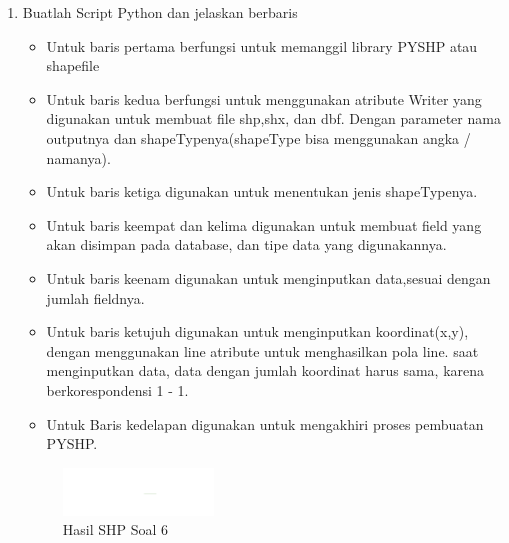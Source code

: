 \begin{enumerate}
	\item Buatlah Script Python dan jelaskan berbaris
	
	\begin{itemize}
		\item Untuk baris pertama berfungsi untuk memanggil library PYSHP atau shapefile
		\item Untuk baris kedua berfungsi untuk menggunakan atribute Writer yang digunakan untuk membuat file shp,shx, dan dbf. \hfill\break Dengan parameter nama outputnya dan shapeTypenya(shapeType bisa menggunakan angka / namanya).
		\item Untuk baris ketiga digunakan untuk menentukan jenis shapeTypenya.
		\item Untuk baris keempat dan kelima digunakan untuk membuat field yang akan disimpan pada database, dan tipe data yang digunakannya.
		\item Untuk baris keenam digunakan untuk menginputkan data,sesuai dengan jumlah fieldnya.
		\item Untuk baris ketujuh digunakan untuk menginputkan koordinat(x,y), dengan menggunakan line atribute untuk menghasilkan pola line. \hfill\break
		saat menginputkan data, data dengan jumlah koordinat harus sama, karena berkorespondensi 1 - 1.
		\item Untuk Baris kedelapan digunakan untuk mengakhiri proses pembuatan PYSHP.
	\end{itemize}
	\hfill\break
	\begin{figure}[H]
		\includegraphics[width=4cm]{figures/1174095/2/6.png}
		\centering
		\caption{Hasil SHP Soal 6}
	\end{figure}


\end{enumerate}
